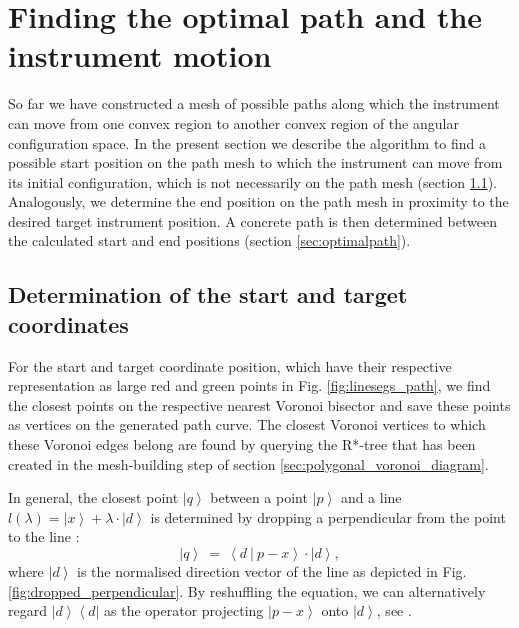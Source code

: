 




\section{Finding the optimal path and the instrument motion}
\label{sec:exepath}

So far we have constructed a mesh of possible paths along which the instrument can move
from one convex region to another convex region of the angular configuration space.
In the present section we describe the algorithm to find a possible start position on the
path mesh to which the instrument can move from its initial configuration, which is
not necessarily on the path mesh (section \ref{sec:startend}).
Analogously, we determine the end position on the path mesh in proximity to the 
desired target instrument position.
A concrete path is then determined between the calculated start and end positions
(section \ref{sec:optimalpath}).


\subsection{Determination of the start and target coordinates}
\label{sec:startend}

For the start and target coordinate position, which have their respective 
representation as large red and green points in Fig. \ref{fig:linesegs_path}, 
we find the closest points on the respective nearest Voronoi bisector and save 
these points as vertices on the generated path curve.
The closest Voronoi vertices to which these Voronoi edges belong are found by 
querying the R*-tree that has been created in the mesh-building step of section
\ref{sec:polygonal_voronoi_diagram}.

In general, the closest point $\left|q\right>$ between a point $\left|p\right>$ 
and a line $l\left(\lambda\right) = \left|x\right> + \lambda \cdot \left|d\right>$ 
is determined by dropping a perpendicular from the point to the line \cite{wiki_proj}:
\begin{equation}
	\left|q\right> \ =\  \left<d  \ |\  p - x \right> \cdot \left|d\right>,
\end{equation}
where $\left|d\right>$ is the normalised direction vector of the line as depicted 
in Fig. \ref{fig:dropped_perpendicular}.
By reshuffling the equation, we can alternatively regard $\left|d\right> \left<d\right|$
as the operator projecting $\left| p - x \right>$ onto $\left|d\right>$, see \cite[p. 814]{Arens2015}.

